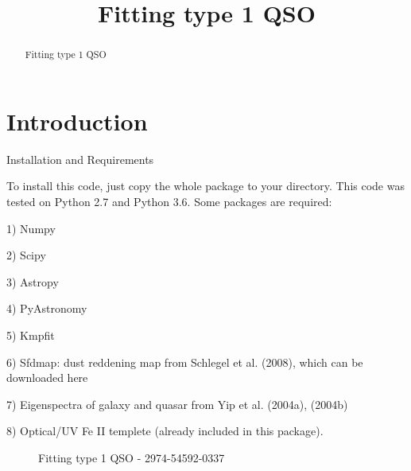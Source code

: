 \documentclass{aastex62}
\begin{document}
\title{Fitting type 1 QSO}

\begin{abstract}

Fitting type 1 QSO

\end{abstract}

\section{Introduction}

Installation and Requirements

To install this code, just copy the whole package to your directory. This code was tested on Python 2.7 and Python 3.6. Some packages are required:

1) Numpy 

2) Scipy

3) Astropy

4) PyAstronomy

5) Kmpfit

6) Sfdmap: dust reddening map from Schlegel et al. (2008), which can be downloaded here

7) Eigenspectra of galaxy and quasar from Yip et al. (2004a), (2004b)

8) Optical/UV Fe II templete (already included in this package).

\begin{figure}[ht!]
\caption{Fitting type 1 QSO - 2974-54592-0337}
\end{figure}
\end{document}
